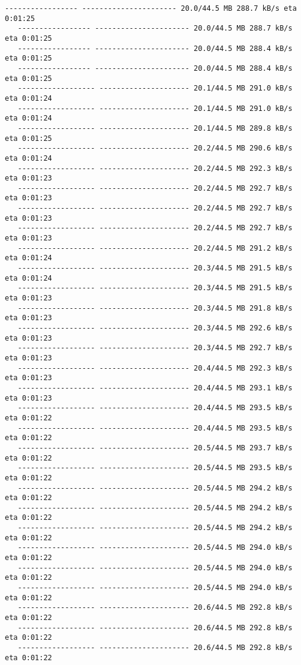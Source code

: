 \documentclass[11pt]{article}
\begin{document}
\begin{Verbatim}[commandchars=\\\{\}]
   ----------------- ---------------------- 20.0/44.5 MB 288.7 kB/s eta 0:01:25
   ----------------- ---------------------- 20.0/44.5 MB 288.7 kB/s eta 0:01:25
   ----------------- ---------------------- 20.0/44.5 MB 288.4 kB/s eta 0:01:25
   ----------------- ---------------------- 20.0/44.5 MB 288.4 kB/s eta 0:01:25
   ------------------ --------------------- 20.1/44.5 MB 291.0 kB/s eta 0:01:24
   ------------------ --------------------- 20.1/44.5 MB 291.0 kB/s eta 0:01:24
   ------------------ --------------------- 20.1/44.5 MB 289.8 kB/s eta 0:01:25
   ------------------ --------------------- 20.2/44.5 MB 290.6 kB/s eta 0:01:24
   ------------------ --------------------- 20.2/44.5 MB 292.3 kB/s eta 0:01:23
   ------------------ --------------------- 20.2/44.5 MB 292.7 kB/s eta 0:01:23
   ------------------ --------------------- 20.2/44.5 MB 292.7 kB/s eta 0:01:23
   ------------------ --------------------- 20.2/44.5 MB 292.7 kB/s eta 0:01:23
   ------------------ --------------------- 20.2/44.5 MB 291.2 kB/s eta 0:01:24
   ------------------ --------------------- 20.3/44.5 MB 291.5 kB/s eta 0:01:24
   ------------------ --------------------- 20.3/44.5 MB 291.5 kB/s eta 0:01:23
   ------------------ --------------------- 20.3/44.5 MB 291.8 kB/s eta 0:01:23
   ------------------ --------------------- 20.3/44.5 MB 292.6 kB/s eta 0:01:23
   ------------------ --------------------- 20.3/44.5 MB 292.7 kB/s eta 0:01:23
   ------------------ --------------------- 20.4/44.5 MB 292.3 kB/s eta 0:01:23
   ------------------ --------------------- 20.4/44.5 MB 293.1 kB/s eta 0:01:23
   ------------------ --------------------- 20.4/44.5 MB 293.5 kB/s eta 0:01:22
   ------------------ --------------------- 20.4/44.5 MB 293.5 kB/s eta 0:01:22
   ------------------ --------------------- 20.5/44.5 MB 293.7 kB/s eta 0:01:22
   ------------------ --------------------- 20.5/44.5 MB 293.5 kB/s eta 0:01:22
   ------------------ --------------------- 20.5/44.5 MB 294.2 kB/s eta 0:01:22
   ------------------ --------------------- 20.5/44.5 MB 294.2 kB/s eta 0:01:22
   ------------------ --------------------- 20.5/44.5 MB 294.2 kB/s eta 0:01:22
   ------------------ --------------------- 20.5/44.5 MB 294.0 kB/s eta 0:01:22
   ------------------ --------------------- 20.5/44.5 MB 294.0 kB/s eta 0:01:22
   ------------------ --------------------- 20.5/44.5 MB 294.0 kB/s eta 0:01:22
   ------------------ --------------------- 20.6/44.5 MB 292.8 kB/s eta 0:01:22
   ------------------ --------------------- 20.6/44.5 MB 292.8 kB/s eta 0:01:22
   ------------------ --------------------- 20.6/44.5 MB 292.8 kB/s eta 0:01:22

\end{Verbatim}
\end{document}
